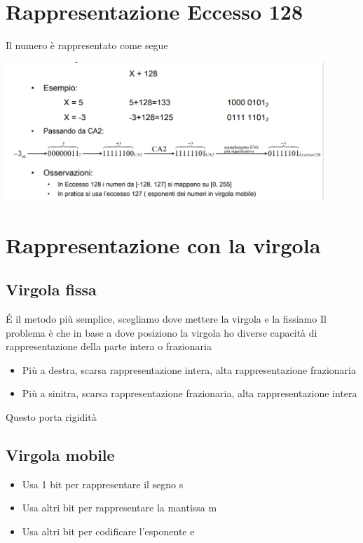 \documentclass[12pt, a4paper, openany]{book}
\begin{document}
\section{Rappresentazione Eccesso 128}
Il numero è rappresentato come segue
\begin{center}
    \includegraphics[width=120mm, scale=0.6]{eccesso128.png}
\end{center}

\section{Rappresentazione con la virgola}
\subsection{Virgola fissa}
\'E il metodo più semplice, scegliamo dove mettere la virgola e la fissiamo
Il problema è che in base a dove posiziono la virgola ho diverse capacità di rappresentazione della parte intera o frazionaria
\begin{itemize}
    \item Più a destra, scarsa rappresentazione intera, alta rappresentazione frazionaria
    \item Più a sinitra, scarsa rappresentazione frazionaria, alta rappresentazione intera
\end{itemize}
Questo porta rigidità

\subsection{Virgola mobile}
\begin{itemize}
    \item Usa 1 bit per rappresentare il segno s
    \item Usa altri bit per rappresentare la mantissa m
    \item Usa altri bit per codificare l'esponente e
\end{itemize}
\end{document}
